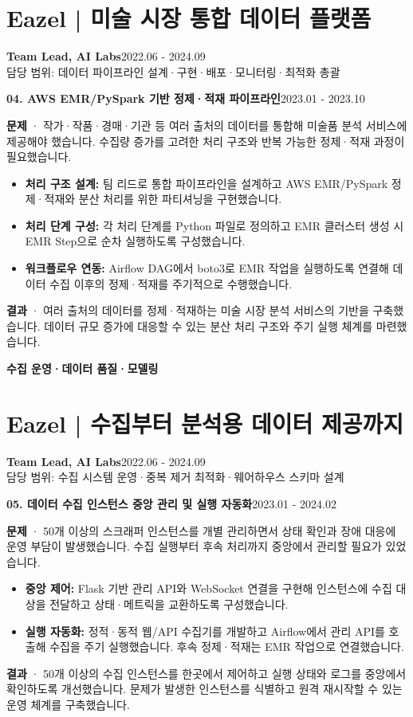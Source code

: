 \documentclass[a4paper,11pt]{article}
\newcommand{\role}[3]{\textbf{#1}\hfill{\small #2}\\{\small\color{muted}#3}\par}
\newcommand{\project}[2]{\vspace{5pt}\textbf{\color{accent}#1}\hfill{\small\color{muted}#2}\par}
\begin{document}
\section{Eazel | 미술 시장 통합 데이터 플랫폼}
\role{Team Lead, AI Labs}{2022.06 - 2024.09}{담당 범위: 데이터 파이프라인 설계·구현·배포·모니터링·최적화 총괄}
\project{04. AWS EMR/PySpark 기반 정제·적재 파이프라인}{2023.01 - 2023.10}
\textbf{문제} · 작가·작품·경매·기관 등 여러 출처의 데이터를 통합해 미술품 분석 서비스에 제공해야 했습니다. 수집량 증가를 고려한 처리 구조와 반복 가능한 정제·적재 과정이 필요했습니다.
\begin{itemize}
\item \textbf{처리 구조 설계:} 팀 리드로 통합 파이프라인을 설계하고 AWS EMR/PySpark 정제·적재와 분산 처리를 위한 파티셔닝을 구현했습니다.
\item \textbf{처리 단계 구성:} 각 처리 단계를 Python 파일로 정의하고 EMR 클러스터 생성 시 EMR Step으로 순차 실행하도록 구성했습니다.
\item \textbf{워크플로우 연동:} Airflow DAG에서 boto3로 EMR 작업을 실행하도록 연결해 데이터 수집 이후의 정제·적재를 주기적으로 수행했습니다.
\end{itemize}
\textbf{결과} · 여러 출처의 데이터를 정제·적재하는 미술 시장 분석 서비스의 기반을 구축했습니다. 데이터 규모 증가에 대응할 수 있는 분산 처리 구조와 주기 실행 체계를 마련했습니다.



\newpage
{\fontsize{21}{27}\selectfont\bfseries\color{accent}수집 운영·데이터 품질·모델링}\par
\section{Eazel | 수집부터 분석용 데이터 제공까지}
\role{Team Lead, AI Labs}{2022.06 - 2024.09}{담당 범위: 수집 시스템 운영·중복 제거 최적화·웨어하우스 스키마 설계}
\project{05. 데이터 수집 인스턴스 중앙 관리 및 실행 자동화}{2023.01 - 2024.02}
\textbf{문제} · 50개 이상의 스크래퍼 인스턴스를 개별 관리하면서 상태 확인과 장애 대응에 운영 부담이 발생했습니다. 수집 실행부터 후속 처리까지 중앙에서 관리할 필요가 있었습니다.
\begin{itemize}
\item \textbf{중앙 제어:} Flask 기반 관리 API와 WebSocket 연결을 구현해 인스턴스에 수집 대상을 전달하고 상태·메트릭을 교환하도록 구성했습니다.
\item \textbf{실행 자동화:} 정적·동적 웹/API 수집기를 개발하고 Airflow에서 관리 API를 호출해 수집을 주기 실행했습니다. 후속 정제·적재는 EMR 작업으로 연결했습니다.
\end{itemize}
\textbf{결과} · 50개 이상의 수집 인스턴스를 한곳에서 제어하고 실행 상태와 로그를 중앙에서 확인하도록 개선했습니다. 문제가 발생한 인스턴스를 식별하고 원격 재시작할 수 있는 운영 체계를 구축했습니다.
\end{document}
